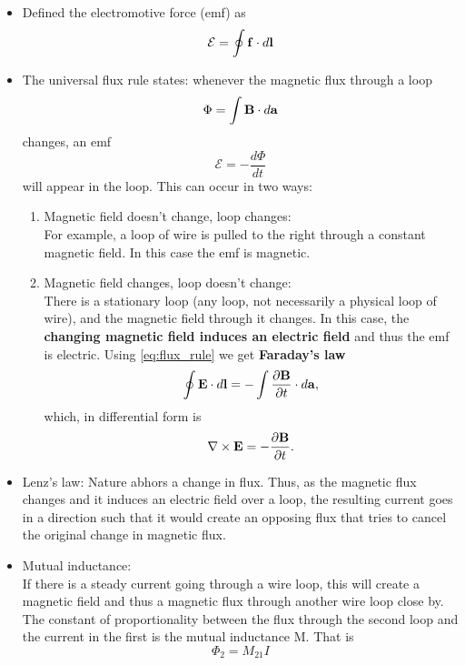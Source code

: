 \documentclass[oneside,a4paper,11pt]{report}
\begin{document}
\begin{itemize} 
\item Defined the electromotive force (emf) as
\begin{equation}
\mathcal{E} = \oint \mathbf{f} \cdot d \mathbf{l}
\end{equation}

\item The universal flux rule states: whenever the magnetic flux through a loop
\begin{equation}
\Phi = \int \mathbf{B} \cdot d\mathbf{a}
\end{equation}
changes, an emf
\begin{equation}
\label{eq:flux_rule}
\mathcal{E} = -\frac{d \Phi}{dt}
\end{equation}
will appear in the loop. This can occur in two ways:
\begin{enumerate}
\item Magnetic field doesn't change, loop changes:\\
For example, a loop of wire is pulled to the right through a constant magnetic field. In this case the emf is magnetic.
\item Magnetic field changes, loop doesn't change:\\
There is a stationary loop (any loop, not necessarily a physical loop of wire), and the magnetic field through it changes. In this case, the \textbf{changing magnetic field induces an electric field} and thus the emf is electric. Using \cref{eq:flux_rule} we get \textbf{Faraday's law}
\begin{equation}
\oint \mathbf{E} \cdot d\mathbf{l} = - \int \frac{ \partial \mathbf{B} }{\partial t} \cdot d\mathbf{a},
\end{equation}
which, in differential form is
\begin{equation}
\nabla \times \mathbf{E} = -\frac{ \partial \mathbf{B}}{\partial t}.
\end{equation}
\end{enumerate}

\item Lenz's law:
Nature abhors a change in flux. Thus, as the magnetic flux changes and it induces an electric field over a loop, the resulting current goes in a direction such that it would create an opposing flux that tries to cancel the original change in magnetic flux.

\item Mutual inductance:\\
If there is a steady current going through a wire loop, this will create a magnetic field and thus a magnetic flux through another wire loop close by. The constant of proportionality between the flux through the second loop and the current in the first is the mutual inductance M. That is
\begin{equation}
\Phi_2 = M_{21} I
\end{equation}


\end{itemize}
\end{document}
